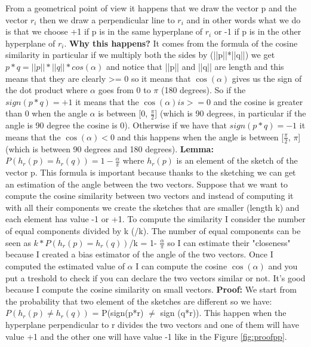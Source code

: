 From a geometrical point of view it happens that we draw the vector p and the vector $r_i$ then we draw a perpendicular line to $r_i$ and in other words what we do is that we choose +1 if p is in the same hyperplane of $r_i$ or -1 if p is in the other hyperplane of $r_i$. \textbf{Why this happens?} It comes from the formula of the cosine similarity in particular if we multiply both the sides by (||p||*||q||) we get $p*q=||p||*||q||*cos(\alpha)$ and notice that ||p|| and ||q|| are length and this means that they are clearly >= 0 so it means that $\cos (\alpha)$ gives us the sign of the dot product where $\alpha$ goes from 0 to $\pi$ (180 degrees). So if the $sign(p*q)=+1$ it means that the $\cos (\alpha) is >= 0$ and the cosine is greater than 0 when the angle $\alpha$ is between [0, $\frac{\pi}{2}$] (which is 90 degrees, in particular if the angle is 90 degree the cosine is 0). Otherwise if we have that $sign(p*q)=-1$ it means that the $\cos (\alpha) < 0$ and this happens when the angle is between [$\frac{\pi}{2}$, $\pi$] (which is between 90 degrees and 180 degrees).\newline
\textbf{Lemma:} $P(h_r(p)=h_r(q))=1-\frac{\alpha}{\pi}$ where $h_r(p)$ is an element of the sketch of the vector p. This formula is important because thanks to the sketching we can get an estimation of the angle between the two vectors.\newline
Suppose that we want to compute the cosine similarity between two vectors and instead of computing it with all their components we create the sketches that are smaller (length k) and each element has value -1 or +1. To compute the similarity I consider the number of equal components divided by k (/k). The number of equal components can be seen as $k*P(h_r(p)=h_r(q))$/k = 1- $\frac{\alpha}{\pi}$ so I can estimate their "closeness" because I created a bias estimator of the angle of the two vectors. Once I computed the estimated value of $\alpha$ I can compute the cosine $\cos (\alpha)$ and you put a treshold to check if you can declare the two vectors similar or not. It's good because I compute the cosine similarity on small vectors.\newline
\textbf{Proof:} We start from the probability that two element of the sketches are different so we have: $P(h_r(p) \neq h_r(q))$ = P(sign(p*r) $\neq$ sign (q*r)). This happen when the hyperplane perpendicular to r divides the two vectors and one of them will have value +1 and the other one will have value -1 like in the Figure \ref{fig:proofpp}.
